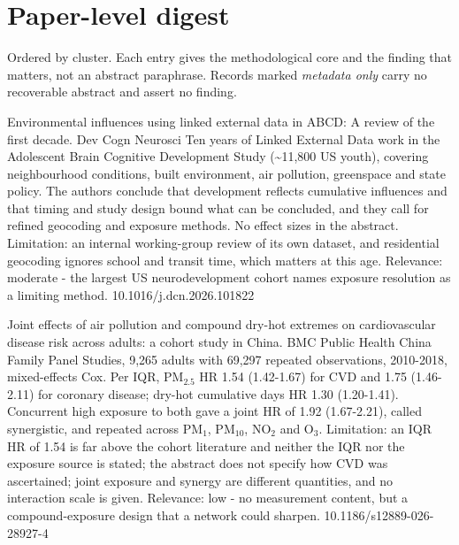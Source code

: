 \documentclass[10pt]{article}
\begin{document}
\vspace{4mm}

\par{}\baselineskip{}\baselineskip
\section*{\sffamily\bfseries\color{Deep}Paper-level digest}
\vspace{-1.5mm}{\color{Amber}\rule{\linewidth}{1.1pt}}\vspace{2.5mm}

{\fontsize{7.4}{9}\selectfont\color{Slate}Ordered by cluster. Each entry gives the
methodological core and the finding that matters, not an abstract paraphrase. Records
marked \textit{metadata only} carry no recoverable abstract and assert no finding.\par}


{Environmental influences using linked external data in ABCD: A review of the first decade.}
{Dev Cogn Neurosci}
{Ten years of Linked External Data work in the Adolescent Brain Cognitive Development Study (\textasciitilde{}11,800 US youth), covering neighbourhood conditions, built environment, air pollution, greenspace and state policy. The authors conclude that development reflects cumulative influences and that timing and study design bound what can be concluded, and they call for refined geocoding and exposure methods. No effect sizes in the abstract. Limitation: an internal working-group review of its own dataset, and residential geocoding ignores school and transit time, which matters at this age. Relevance: moderate - the largest US neurodevelopment cohort names exposure resolution as a limiting method.}
{10.1016/j.dcn.2026.101822}

\par{}\baselineskip{}\baselineskip
{}

{Joint effects of air pollution and compound dry-hot extremes on cardiovascular disease risk across adults: a cohort study in China.}
{BMC Public Health}
{China Family Panel Studies, 9,265 adults with 69,297 repeated observations, 2010-2018, mixed-effects Cox. Per IQR, PM$_{2.5}$ HR 1.54 (1.42-1.67) for CVD and 1.75 (1.46-2.11) for coronary disease; dry-hot cumulative days HR 1.30 (1.20-1.41). Concurrent high exposure to both gave a joint HR of 1.92 (1.67-2.21), called synergistic, and repeated across PM$_{1}$, PM$_{10}$, NO$_2$ and O$_3$. Limitation: an IQR HR of 1.54 is far above the cohort literature and neither the IQR nor the exposure source is stated; the abstract does not specify how CVD was ascertained; joint exposure and synergy are different quantities, and no interaction scale is given. Relevance: low - no measurement content, but a compound-exposure design that a network could sharpen.}
{10.1186/s12889-026-28927-4}
\end{document}
